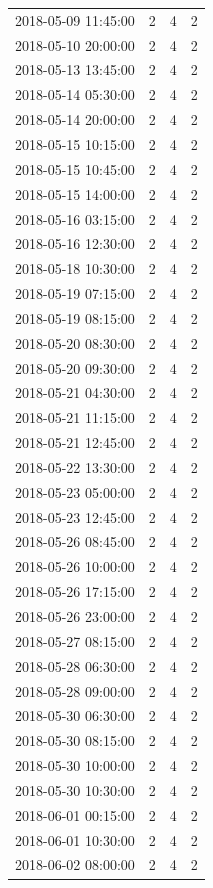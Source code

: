 \begin{tabular}{lrrr}
2018-05-09 11:45:00 & 2 & 4 & 2 \\
2018-05-10 20:00:00 & 2 & 4 & 2 \\
2018-05-13 13:45:00 & 2 & 4 & 2 \\
2018-05-14 05:30:00 & 2 & 4 & 2 \\
2018-05-14 20:00:00 & 2 & 4 & 2 \\
2018-05-15 10:15:00 & 2 & 4 & 2 \\
2018-05-15 10:45:00 & 2 & 4 & 2 \\
2018-05-15 14:00:00 & 2 & 4 & 2 \\
2018-05-16 03:15:00 & 2 & 4 & 2 \\
2018-05-16 12:30:00 & 2 & 4 & 2 \\
2018-05-18 10:30:00 & 2 & 4 & 2 \\
2018-05-19 07:15:00 & 2 & 4 & 2 \\
2018-05-19 08:15:00 & 2 & 4 & 2 \\
2018-05-20 08:30:00 & 2 & 4 & 2 \\
2018-05-20 09:30:00 & 2 & 4 & 2 \\
2018-05-21 04:30:00 & 2 & 4 & 2 \\
2018-05-21 11:15:00 & 2 & 4 & 2 \\
2018-05-21 12:45:00 & 2 & 4 & 2 \\
2018-05-22 13:30:00 & 2 & 4 & 2 \\
2018-05-23 05:00:00 & 2 & 4 & 2 \\
2018-05-23 12:45:00 & 2 & 4 & 2 \\
2018-05-26 08:45:00 & 2 & 4 & 2 \\
2018-05-26 10:00:00 & 2 & 4 & 2 \\
2018-05-26 17:15:00 & 2 & 4 & 2 \\
2018-05-26 23:00:00 & 2 & 4 & 2 \\
2018-05-27 08:15:00 & 2 & 4 & 2 \\
2018-05-28 06:30:00 & 2 & 4 & 2 \\
2018-05-28 09:00:00 & 2 & 4 & 2 \\
2018-05-30 06:30:00 & 2 & 4 & 2 \\
2018-05-30 08:15:00 & 2 & 4 & 2 \\
2018-05-30 10:00:00 & 2 & 4 & 2 \\
2018-05-30 10:30:00 & 2 & 4 & 2 \\
2018-06-01 00:15:00 & 2 & 4 & 2 \\
2018-06-01 10:30:00 & 2 & 4 & 2 \\
2018-06-02 08:00:00 & 2 & 4 & 2 \\

\end{tabular}
